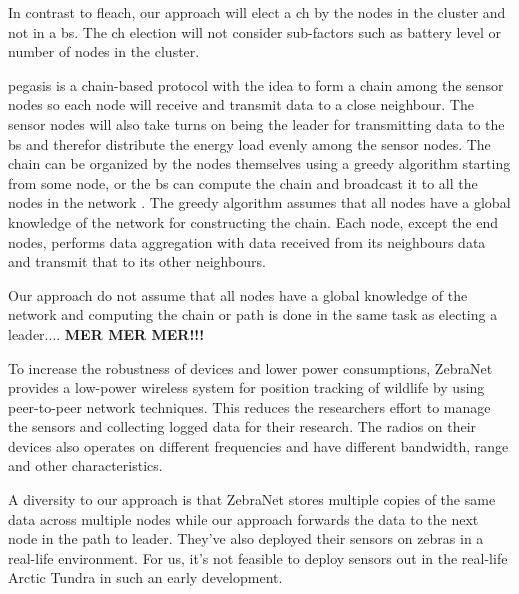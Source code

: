 \documentclass[USenglish]{uit-thesis}
\begin{document}
In contrast to \gls{fleach}, our approach will elect a \gls{ch} by the nodes in the cluster and not in a \gls{bs}. The \gls{ch} election will not consider sub-factors such as battery level or number of nodes in the cluster.


\Gls{pegasis} is a chain-based protocol with the idea to form a chain among the sensor nodes so each node will receive and transmit data to a close neighbour. The sensor nodes will also take turns on being the leader for transmitting data to the \gls{bs} and therefor distribute the energy load evenly among the sensor nodes. The chain can be organized by the nodes themselves using a greedy algorithm starting from some node, or the \gls{bs} can compute the chain and broadcast it to all the nodes in the network \cite{pegasis}. The greedy algorithm assumes that all nodes have a global knowledge of the network for constructing the chain. Each node, except the end nodes, performs data aggregation with data received from its neighbours data and transmit that to its other neighbours.

Our approach do not assume that all nodes have a global knowledge of the network and computing the chain or path is done in the same task as electing a leader....  \textbf{MER MER MER!!!}

To increase the robustness of devices and lower power consumptions, ZebraNet \cite{zebranet} provides a low-power wireless system for position tracking of wildlife by using peer-to-peer network techniques. This reduces the researchers effort to manage the sensors and collecting logged data for their research. The radios on their devices also operates on different frequencies and have different bandwidth, range and other characteristics.

A diversity to our approach is that ZebraNet stores multiple copies of the same data across multiple nodes while our approach forwards the data to the next node in the path to leader. They've also deployed their sensors on zebras in a real-life environment. For us, it's not feasible to deploy sensors out in the real-life Arctic Tundra in such an early development.



\end{document}

